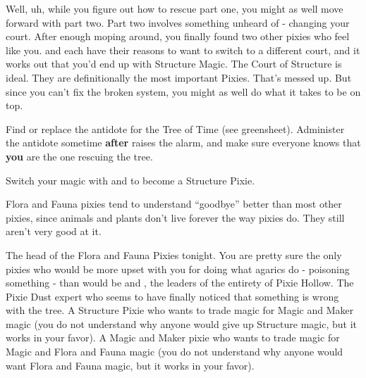 \documentclass[char]{PP}
\begin{document}
Well, uh, while you figure out how to rescue part one, you might as well move forward with part two. Part two involves something unheard of - changing your court. After enough moping around, you finally found two other pixies who feel like you. \cSAdvisor{} and \cMChange{} each have their reasons to want to switch to a different court, and it works out that you’d end up with Structure Magic. The Court of Structure is ideal. They are definitionally the most important Pixies. That’s messed up. But since you can’t fix the broken system, you might as well do what it takes to be on top.

\begin{itemz}
	\item Find or replace the antidote for the Tree of Time (see greensheet). Administer the antidote sometime \textbf{after} \cMTree{} raises the alarm, and make sure everyone knows that \textbf{you} are the one rescuing the tree.
	\item Switch your magic with \cSAdvisor{} and \cMChange{} to become a Structure Pixie.
\end{itemz}

\begin{itemz}[Notes]
	\item Flora and Fauna pixies tend to understand ``goodbye'' better than most other pixies, since animals and plants don’t live forever the way pixies do. They still aren't very good at it.
\end{itemz}

\begin{contacts}
	\contact{\cFHead{}} The head of the Flora and Fauna Pixies tonight. You are pretty sure the only pixies who would be more upset with you for doing what agarics do - poisoning something - than \cFHead{} would be \cSHead{} and \cSAdvisor{}, the leaders of the entirety of Pixie Hollow.
	\contact{\cMTree{}} The Pixie Dust expert who seems to have finally noticed that something is wrong with the tree.
	\contact{\cSAdvisor{}} A Structure Pixie who wants to trade \cSAdvisor{\their} magic for Magic and Maker magic (you do not understand why anyone would give up Structure magic, but it works in your favor).
	\contact{\cMChange{}} A Magic and Maker pixie who wants to trade \cSAdvisor{\their} magic for Magic and Flora and Fauna magic (you do not understand why anyone would want Flora and Fauna magic, but it works in your favor).
\end{contacts}
\end{document}
